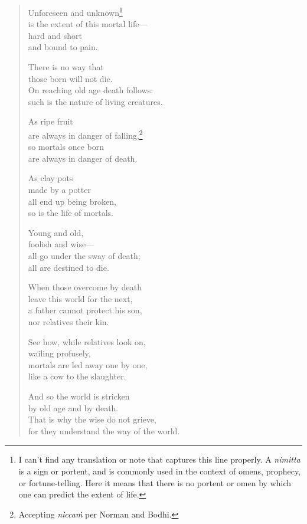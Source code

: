 \documentclass[12pt,openany]{book}%
\begin{document}
\begin{verse}%
Unforeseen and unknown\footnote{I can’t find any translation or note that captures this line properly. A \textit{nimitta} is a sign or portent, and is commonly used in the context of omens, prophecy, or fortune-telling. Here it means that there is no portent or omen by which one can predict the extent of life. } \\
is the extent of this mortal life—\\
hard and short \\
and bound to pain. 

There is no way that \\
those born will not die. \\
On reaching old age death follows: \\
such is the nature of living creatures. 

As ripe fruit \\
are always in danger of falling,\footnote{Accepting \textit{\textsanskrit{niccaṁ}} per Norman and Bodhi. } \\
so mortals once born \\
are always in danger of death. 

As clay pots \\
made by a potter \\
all end up being broken, \\
so is the life of mortals. 

Young and old, \\
foolish and wise—\\
all go under the sway of death; \\
all are destined to die. 

When those overcome by death \\
leave this world for the next, \\
a father cannot protect his son, \\
nor relatives their kin. 

See how, while relatives look on, \\
wailing profusely, \\
mortals are led away one by one, \\
like a cow to the slaughter. 

And so the world is stricken \\
by old age and by death. \\
That is why the wise do not grieve, \\
for they understand the way of the world. 


\end{verse}
\end{document}
